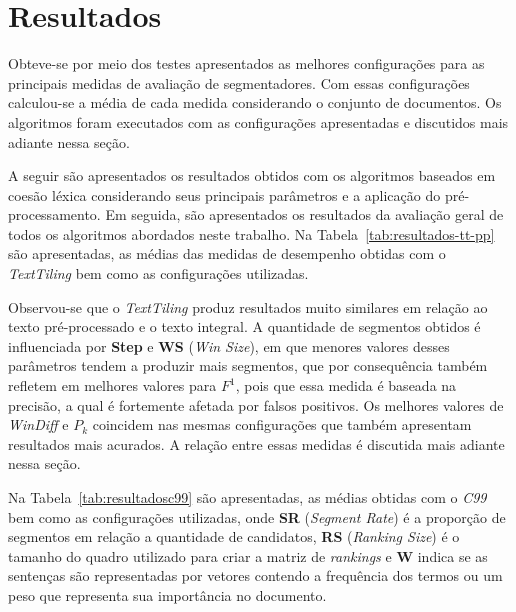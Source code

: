 \section{Resultados}

Obteve-se por meio dos testes apresentados as melhores configurações para as principais medidas de avaliação de segmentadores. Com essas configurações calculou-se a média de cada medida considerando o conjunto de documentos. Os algoritmos foram executados com as configurações apresentadas e discutidos mais adiante nessa seção.

A seguir são apresentados os resultados obtidos com os algoritmos baseados em coesão léxica 
considerando seus principais parâmetros e a aplicação do pré-processamento. Em seguida, são apresentados os resultados da avaliação geral de todos os algoritmos abordados neste trabalho.
Na Tabela~\ref{tab:resultados-tt-pp} são apresentadas, as médias das medidas de desempenho obtidas com o \textit{TextTiling} bem como as configurações utilizadas.


	  



Observou-se que o \textit{TextTiling} produz resultados muito similares em relação ao texto pré-processado e o texto integral. A quantidade de segmentos obtidos é influenciada por \textbf{Step} e \textbf{WS} (\textit{Win Size}), em que menores valores desses parâmetros tendem a produzir mais segmentos, que por consequência também refletem em melhores valores para $F^1$, pois que essa medida é baseada na precisão, a qual é fortemente afetada por falsos positivos. Os melhores valores de \textit{WinDiff} e $P_k$ coincidem nas mesmas configurações que também apresentam resultados mais acurados. A relação entre essas medidas é discutida mais adiante nessa seção.



  


Na Tabela~\ref{tab:resultadosc99} são apresentadas, as médias obtidas com o \textit{C99} bem como as configurações utilizadas, onde \textbf{SR} (\textit{Segment Rate}) é a proporção de segmentos em relação a quantidade de candidatos, \textbf{RS} (\textit{Ranking Size}) é o tamanho do quadro utilizado para criar a matriz de \textit{rankings} e \textbf{W} indica se as sentenças são representadas por vetores contendo a frequência dos termos ou um peso que representa sua importância no documento. %



